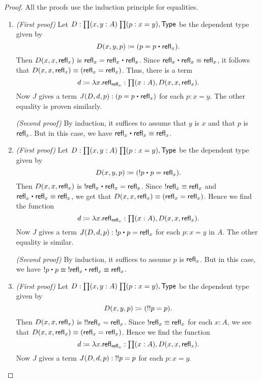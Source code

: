 \begin{proof}
  All the proofs use the induction principle for equalities.
  \begin{enumerate}
  \item \emph{(First proof)} Let $D:\prd{x,y:A}{p:x=y} \type$ be the dependent type given by 
    \begin{equation*}
      D(x,y,p)\defeq (p= p\ct \refl{x}).
    \end{equation*}
    Then $D(x,x,\mathsf{refl}_{x})$ is $\refl{x}=\refl{x}\ct\refl{x}$.
    Since $\refl{x}\ct\refl{x}\jdeq\refl{x}$, it follows that $D(x,x,\mathsf{refl}_{x})\equiv (\mathsf{refl}_{x}=\mathsf{refl}_{x})$.
    Thus, there is a term
    \begin{equation*}
      d\defeq\lambda x.\refl{\refl{x}}:\prd{x:A} D(x,x,\refl{x}).
    \end{equation*}
    Now $J$ gives a term $J(D,d,p):(p= p\ct\refl{x})$ for each $p:x= y$.
    The other equality is proven similarly.

    \noindent
    \emph{(Second proof)} By induction, it suffices to assume that $y$ is $x$ and that $p$ is $\mathsf{refl}_{x}$.
    But in this case, we have $\refl{x}\ct\refl{x}\jdeq\refl{x}$.
  \item \emph{(First proof)} Let $D:\prd{x,y:A}{p:x=y} \type$ be the dependent type given by 
    \begin{equation*}
      D(x,y,p)\defeq (\opp{p}\ct p=  \refl{x}).
    \end{equation*}
    Then $D(x,x,\mathsf{refl}_{x})$ is $\opp{\refl{x}}\ct\refl{x}=\refl{x}$.
    Since $\mathord{!{\mathsf{refl}_{x}}}\equiv\mathsf{refl}_{x}$ and $\refl{x}\ct\refl{x}\jdeq\refl{x}$, we get that $D(x,x,\mathsf{refl}_{x})\equiv (\mathsf{refl}_{x}=\mathsf{refl}_{x})$.
    Hence we find the function
    \begin{equation*}
      d\defeq\lambda x.\refl{\refl{x}}:\prd{x:A} D(x,x,\refl{x}).
    \end{equation*}
    Now $J$ gives a term $J(D,d,p):\opp{p}\ct p=\refl{x}$ for each $p:x= y$ in $A$.
    The other equality is similar.

    \noindent \emph{(Second proof)} By induction, it suffices to assume $p$ is $\mathsf{refl}_{x}$.
    But in this case, we have $\opp{p} \ct p \jdeq \opp{\refl x} \ct \refl x \jdeq \refl x$.
  \item \emph{(First proof)} Let $D:\prd{x,y:A}{p:x=y} \type$ be the dependent type given by
    \begin{equation*}
      D(x,y,p)\coloneqq (\mathord{!{\mathord{!{p}}}}= p).
    \end{equation*}
    Then $D(x,x,\mathsf{refl}_{x})$ is $\mathord{!{\mathord{!{\mathsf{refl}_{x}}}}}=\mathsf{refl}_{x}$.
    Since $\mathord{!{\mathsf{refl}_{x}}}\equiv \mathsf{refl}_{x}$ for each $x:A$, we see that $D(x,x,\mathsf{refl}_{x})\equiv(\mathsf{refl}_{x}=\mathsf{refl}_{x})$.
    Hence we find the function
    \begin{equation*}
      d\defeq\lambda x.\refl{\refl{x}}:\prd{x:A} D(x,x,\refl{x}).
    \end{equation*}
    Now $J$ gives a term $J(D,d,p):\mathord{!{\mathord{!{p}}}}= p$ for each $p:x= y$.


\end{enumerate}
\end{proof}
